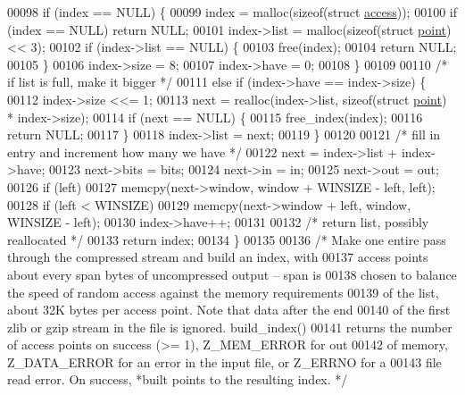 \begin{DoxyCode}
00098     \textcolor{keywordflow}{if} (index == NULL) \{
00099         index = malloc(\textcolor{keyword}{sizeof}(\textcolor{keyword}{struct} \hyperlink{structaccess}{access}));
00100         \textcolor{keywordflow}{if} (index == NULL) \textcolor{keywordflow}{return} NULL;
00101         index->list = malloc(\textcolor{keyword}{sizeof}(\textcolor{keyword}{struct} \hyperlink{structpoint}{point}) << 3);
00102         \textcolor{keywordflow}{if} (index->list == NULL) \{
00103             free(index);
00104             \textcolor{keywordflow}{return} NULL;
00105         \}
00106         index->size = 8;
00107         index->have = 0;
00108     \}
00109 
00110     \textcolor{comment}{/* if list is full, make it bigger */}
00111     \textcolor{keywordflow}{else} \textcolor{keywordflow}{if} (index->have == index->size) \{
00112         index->size <<= 1;
00113         next = realloc(index->list, \textcolor{keyword}{sizeof}(\textcolor{keyword}{struct} \hyperlink{structpoint}{point}) * index->size);
00114         \textcolor{keywordflow}{if} (next == NULL) \{
00115             free\_index(index);
00116             \textcolor{keywordflow}{return} NULL;
00117         \}
00118         index->list = next;
00119     \}
00120 
00121     \textcolor{comment}{/* fill in entry and increment how many we have */}
00122     next = index->list + index->have;
00123     next->bits = bits;
00124     next->in = in;
00125     next->out = out;
00126     \textcolor{keywordflow}{if} (left)
00127         memcpy(next->window, window + WINSIZE - left, left);
00128     \textcolor{keywordflow}{if} (left < WINSIZE)
00129         memcpy(next->window + left, window, WINSIZE - left);
00130     index->have++;
00131 
00132     \textcolor{comment}{/* return list, possibly reallocated */}
00133     \textcolor{keywordflow}{return} index;
00134 \}
00135 
00136 \textcolor{comment}{/* Make one entire pass through the compressed stream and build an index, with}
00137 \textcolor{comment}{   access points about every span bytes of uncompressed output -- span is}
00138 \textcolor{comment}{   chosen to balance the speed of random access against the memory requirements}
00139 \textcolor{comment}{   of the list, about 32K bytes per access point.  Note that data after the end}
00140 \textcolor{comment}{   of the first zlib or gzip stream in the file is ignored.  build\_index()}
00141 \textcolor{comment}{   returns the number of access points on success (>= 1), Z\_MEM\_ERROR for out}
00142 \textcolor{comment}{   of memory, Z\_DATA\_ERROR for an error in the input file, or Z\_ERRNO for a}
00143 \textcolor{comment}{   file read error.  On success, *built points to the resulting index. */}

\end{DoxyCode}
